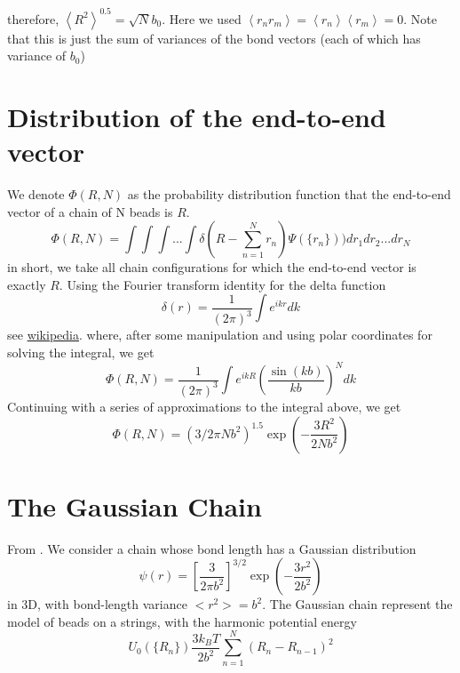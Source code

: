 \documentclass{paper}
\begin{document}
therefore, $\left<R^2\right>^{0.5}=\sqrt{N}b_0$. Here we used  $\left<r_nr_m\right>=\left<r_n\right>\left<r_m\right>=0$. Note that this is just the sum of variances of the bond vectors (each of which has variance of $b_0$)

\section{Distribution of the end-to-end vector}\label{section_distributionOfTheEndToEndVector}
We denote $\Phi(R,N)$ as the probability distribution function that the end-to-end vector of a chain of N beads is $R$.
\begin{equation*}
\Phi(R,N) =\int\int\int...\int\delta(R-\sum_{n=1}^Nr_n)\Psi(\{r_n\}))dr_1dr_2...dr_N
\end{equation*}
in short, we take all chain configurations for which the end-to-end vector is exactly $R$. Using the Fourier transform identity for the delta function
\begin{equation*}
\delta(r)= \frac{1}{(2\pi)^3}\int e^{ikr} dk
\end{equation*}
see \href{http://en.wikipedia.org/wiki/Dirac_delta_function}{wikipedia}.
where, after some manipulation and using polar coordinates for solving the integral, we get
\begin{equation*}
\Phi(R,N)=\frac{1}{(2\pi)^3}\int e^{ikR} \left(\frac{\sin(kb)}{kb}\right)^N dk
\end{equation*}
Continuing with a series of approximations to the integral above, we get
\begin{equation*}
\Phi(R,N)=(3/2\pi N b^2)^{1.5} \exp(-\frac{3R^2}{2Nb^2})
\end{equation*}


\section{The Gaussian Chain}\label{section_theGaussianChain}
From \cite{doi1986theory}. We consider a chain whose bond length has a Gaussian distribution 
\begin{equation*}
\psi(r)=\left[\frac{3}{2\pi b^2} \right]^{3/2} \exp \left( -\frac{3r^2}{2b^2} \right)
\end{equation*}
in 3D,  with bond-length variance $<r^2> =b^2$. The Gaussian chain represent the model of beads on a strings, with the harmonic potential energy 
\begin{equation*}
U_0(\{R_n\})\frac{3k_BT}{2b^2}\sum_{n=1}^N (R_n-R_{n-1})^2
\end{equation*}
\end{document}
